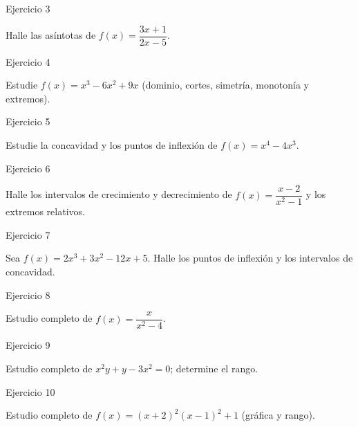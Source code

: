 \documentclass[aspectratio=169]{beamer}
\begin{document}
\begin{frame}{Ejercicio 3}
  \begin{mwejercicio}
    Halle las asíntotas de $f(x) = \dfrac{3x + 1}{2x - 5}$.
  \end{mwejercicio}
\end{frame}

\begin{frame}{Ejercicio 4}
  \begin{mwejercicio}
    Estudie $f(x) = x^3 - 6x^2 + 9x$ (dominio, cortes, simetría, monotonía y extremos).
  \end{mwejercicio}
\end{frame}

\begin{frame}{Ejercicio 5}
  \begin{mwejercicio}
    Estudie la concavidad y los puntos de inflexión de $f(x) = x^4 - 4x^3$.
  \end{mwejercicio}
\end{frame}

\begin{frame}{Ejercicio 6}
  \begin{mwejercicio}
    Halle los intervalos de crecimiento y decrecimiento de $f(x) = \dfrac{x - 2}{x^2 - 1}$ y los extremos relativos.
  \end{mwejercicio}
\end{frame}

\begin{frame}{Ejercicio 7}
  \begin{mwejercicio}
    Sea $f(x) = 2x^3 + 3x^2 - 12x + 5$. Halle los puntos de inflexión y los intervalos de concavidad.
  \end{mwejercicio}
\end{frame}

\begin{frame}{Ejercicio 8}
  \begin{mwejercicio}
    Estudio completo de $f(x) = \dfrac{x}{x^2 - 4}$.
  \end{mwejercicio}
\end{frame}

\begin{frame}{Ejercicio 9}
  \begin{mwejercicio}
    Estudio completo de $x^2 y + y - 3x^2 = 0$; determine el rango.
  \end{mwejercicio}
\end{frame}

\begin{frame}{Ejercicio 10}
  \begin{mwejercicio}
    Estudio completo de $f(x) = (x+2)^2(x-1)^2 + 1$ (gráfica y rango).
  \end{mwejercicio}
\end{frame}
\end{document}
